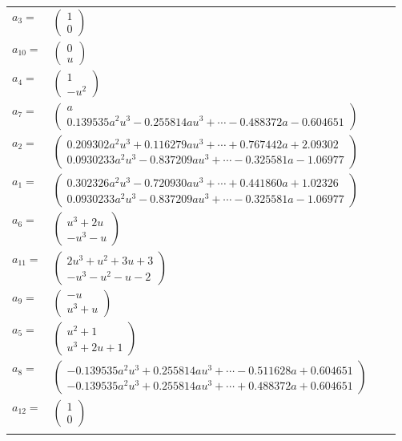\documentclass[1p]{elsarticle_modified}
\theoremstyle{definition}
\begin{document}
\begin{tabular}{m{7pt} m{180pt} m{7pt} m{180pt} }
\flushright $a_{3}=$&$\begin{pmatrix}1\\0\end{pmatrix}$ \\
\flushright $a_{10}=$&$\begin{pmatrix}0\\u\end{pmatrix}$ \\
\flushright $a_{4}=$&$\begin{pmatrix}1\\- u^2\end{pmatrix}$ \\
\flushright $a_{7}=$&$\begin{pmatrix}a\\0.139535 a^{2} u^{3}-0.255814 a u^{3}+\cdots-0.488372 a-0.604651\end{pmatrix}$ \\
\flushright $a_{2}=$&$\begin{pmatrix}0.209302 a^{2} u^{3}+0.116279 a u^{3}+\cdots+0.767442 a+2.09302\\0.0930233 a^{2} u^{3}-0.837209 a u^{3}+\cdots-0.325581 a-1.06977\end{pmatrix}$ \\
\flushright $a_{1}=$&$\begin{pmatrix}0.302326 a^{2} u^{3}-0.720930 a u^{3}+\cdots+0.441860 a+1.02326\\0.0930233 a^{2} u^{3}-0.837209 a u^{3}+\cdots-0.325581 a-1.06977\end{pmatrix}$ \\
\flushright $a_{6}=$&$\begin{pmatrix}u^3+2 u\\- u^3- u\end{pmatrix}$ \\
\flushright $a_{11}=$&$\begin{pmatrix}2 u^3+u^2+3 u+3\\- u^3- u^2- u-2\end{pmatrix}$ \\
\flushright $a_{9}=$&$\begin{pmatrix}- u\\u^3+u\end{pmatrix}$ \\
\flushright $a_{5}=$&$\begin{pmatrix}u^2+1\\u^3+2 u+1\end{pmatrix}$ \\
\flushright $a_{8}=$&$\begin{pmatrix}-0.139535 a^{2} u^{3}+0.255814 a u^{3}+\cdots-0.511628 a+0.604651\\-0.139535 a^{2} u^{3}+0.255814 a u^{3}+\cdots+0.488372 a+0.604651\end{pmatrix}$ \\
\flushright $a_{12}=$&$\begin{pmatrix}1\\0\end{pmatrix}$\\&\end{tabular}
\end{document}
